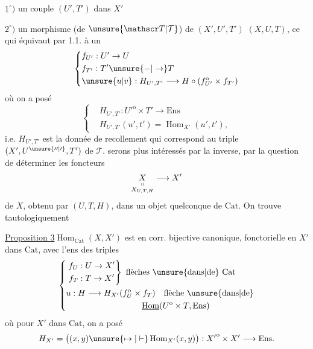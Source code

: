 $\underline{1}^{\circ})$ un couple $(U',T')$ dans $X'$

$2^{\circ})$ un morphisme (de $\unsure{\mathscr T|\mathcal T}$) de $(X',U',T')$
 $(X,U,T)$, ce qui équivaut par 1.1.
à un 
\[
\left\{\begin{aligned}
&f_{U'}:U'\to U\\
&f_{T'}:T'\unsure{-|\to}T\\
&\unsure{u|v}:H_{U',T'}\longrightarrow H\circ(f_{U'}^{\mathrm o}\times f_{T'})
\end{aligned}\right.
\]
où on a posé
\[
\left\{\begin{aligned}
&H_{U',T'}:{U'}^{\mathrm o}\times T'\longrightarrow\mathrm{Ens}\\
&H_{U',T'}(u',t')=\operatorname{Hom}_{X'}(u',t'),
\end{aligned}\right.
\]
i.e. $H_{U',T'}$ est la donnée de recollement
qui correspond au triple $(X',U^{\unsure{\prime\prime|\prime}},T')$ de $\mathscr T$.
 serons plus intéressés par la  inverse,
 par la question de déterminer les
foncteurs
\[
\underset{\substack{\shortparallel\\X_{U,T,H}}}{X}\longrightarrow X'
\]
de $X$, obtenu par $(U,T,H)$, dans un objet
quelconque de $\mathrm{Cat}$. On trouve tautologiquement

\uline{Proposition 3}\quad $\operatorname{Hom}_{\mathrm{Cat}}(X,X')$ est en corr. bijective
canonique, fonctorielle en $X'$ dans $\mathrm{Cat}$, avec
l'ens des triples
\[
\left\{\begin{aligned}
&\left.\begin{aligned}
f_U &: U\to X'\\
f_T &: T\to X'
\end{aligned}\right\}\ \text{flèches \unsure{dans|de} $\mathrm{Cat}$}\\
&u:H\longrightarrow H_{X'}(f_U^{\mathrm o}\times f_T)\quad\text{flèche \unsure{dans|de}}\\
&\hspace{9em}\underline{\operatorname{Hom}}(U^{\mathrm o}\times T,\mathrm{Ens})
\end{aligned}\right.
\]
où pour  $X'$ dans $\mathrm{Cat}$, on a posé
\[
H_{X'}=\bigl((x,y)\unsure{\mapsto|\vdash}\operatorname{Hom}_{X'}(x,y)\bigr):
{X'}^{\mathrm o}\times X'\longrightarrow\mathrm{Ens}.
\]

